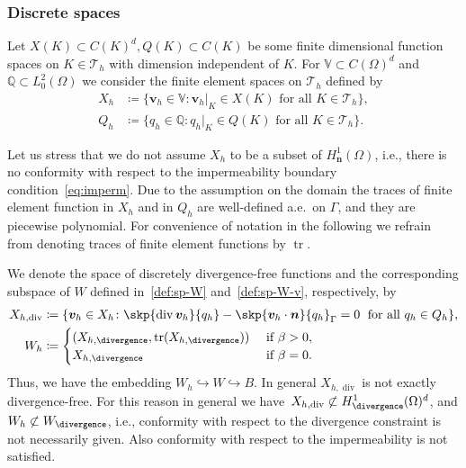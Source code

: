 \documentclass[reqno,a4paper]{amsart}
\def\vec#1{\boldsymbol{#1}}
\def\tr{\mathop{\mathrm{tr}}\nolimits}
\def\diver{\mathop{\mathrm{div}}\nolimits} %
\def\Bh{{W_h}}
\def\Wdiv{{W_{\divergence}}}
\def\bn{\vec{n}}
\def\bv{\vec{v}}
\def\Xdiv{X_{h,\diver}}
\def\Xh{X_{h}}
\def\tria{\mathcal{T}_h}
\begin{document}
\subsubsection*{Discrete spaces} Let $X(K) \subset C(K)^d, Q(K)\subset C(K)$ be some finite dimensional 
function spaces on $K \in \tria$ with dimension independent of $K$. 
%
For $\mathbb{V}\subset C(\Omega)^d$ and $\mathbb{Q}\subset L^2_0(\Omega)$ we consider the finite element spaces on $\tria$ defined by
\begin{equation}\label{eq:fem}
	\begin{aligned}
		X_h &\coloneqq \{ \bv_h\in  \mathbb{V} \colon  \bv_h|_{K} \in X(K) \text{ for all } K \in \tria\},\\
		Q_h& \coloneqq \{ q_h \in  \mathbb{Q} \colon q_h|_{K} \in Q(K) \text{ for all } K \in \tria\}. 
	\end{aligned}
\end{equation}

Let us stress that we do not assume $X_h$ to be a subset of  $H^1_{\bn}(\Omega)$, i.e., there is no conformity with respect to the impermeability boundary condition~\eqref{eq:imperm}. 
Due to the assumption on the domain the traces of finite element function in $X_h$ and in $Q_h$ are well-defined a.e.~on $\Gamma$, and they are piecewise polynomial. 
For convenience of notation in the following we refrain from denoting traces of finite element functions by $\tr$. 

We denote the space of discretely divergence-free functions and the corresponding subspace of $W$ defined in~\eqref{def:sp-W} and~\eqref{def:sp-W-v}, respectively, by 
\begin{align}\label{def:Xdiv}
	\Xdiv &\coloneqq \{\bv_h \in \Xh \colon 	\skp{ \diver \bv_h}{ q_h } - \skp{ \bv_h \cdot \bn}{ q_h }_{\Gamma} = 0\; \text{ for all } q_h \in Q_h \},
	\\
	\label{def:Bh}
	\Bh &\coloneqq \begin{cases} 
		(X_{h,\divergence},\tr(X_{h,\divergence}))
		& \text{ if } \beta > 0,\\
		X_{h,\divergence}
		&\text{ if } \beta = 0.
	\end{cases}
\end{align}
% 
Thus, we have the embedding $W_h\hookrightarrow W \hookrightarrow B$. 
In general $\Xdiv$ is not exactly divergence-free. 
For this reason in general we have~$\Xdiv\not\subset H^1_{\divergence}(\Omega)^d$, and $\Bh \not\subset \Wdiv$, i.e., conformity with respect to the divergence constraint is not necessarily given. 
Also conformity with respect to the impermeability is not satisfied. 
\end{document}
